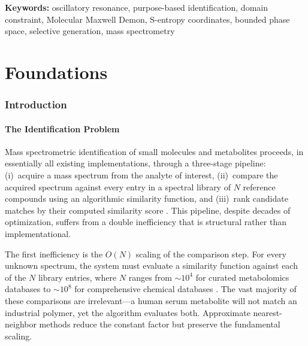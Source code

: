 \documentclass[11pt,twocolumn,a4paper]{article}
\theoremstyle{definition}
\theoremstyle{remark}
\begin{document}
\medskip
\noindent\textbf{Keywords:} oscillatory resonance, purpose-based identification, domain constraint, Molecular Maxwell Demon, S-entropy coordinates, bounded phase space, selective generation, mass spectrometry


\part{Foundations}\label{part:foundations}

\section{Introduction}\label{sec:introduction}

\subsection{The Identification Problem}\label{sec:id-problem}

Mass spectrometric identification of small molecules and metabolites proceeds, in essentially all existing implementations, through a three-stage pipeline: (i)~acquire a mass spectrum from the analyte of interest, (ii)~compare the acquired spectrum against every entry in a spectral library of $N$ reference compounds using an algorithmic similarity function, and (iii)~rank candidate matches by their computed similarity score \citep{stein1994,gross2017}. This pipeline, despite decades of optimization, suffers from a double inefficiency that is structural rather than implementational.

The first inefficiency is the $O(N)$ scaling of the comparison step. For every unknown spectrum, the system must evaluate a similarity function against each of the $N$ library entries, where $N$ ranges from ${\sim}10^4$ for curated metabolomics databases \citep{wishart2022} to ${\sim}10^8$ for comprehensive chemical databases \citep{kim2023}. The vast majority of these comparisons are irrelevant---a human serum metabolite will not match an industrial polymer, yet the algorithm evaluates both. Approximate nearest-neighbor methods \citep{indyk1998} reduce the constant factor but preserve the fundamental scaling.
\end{document}
